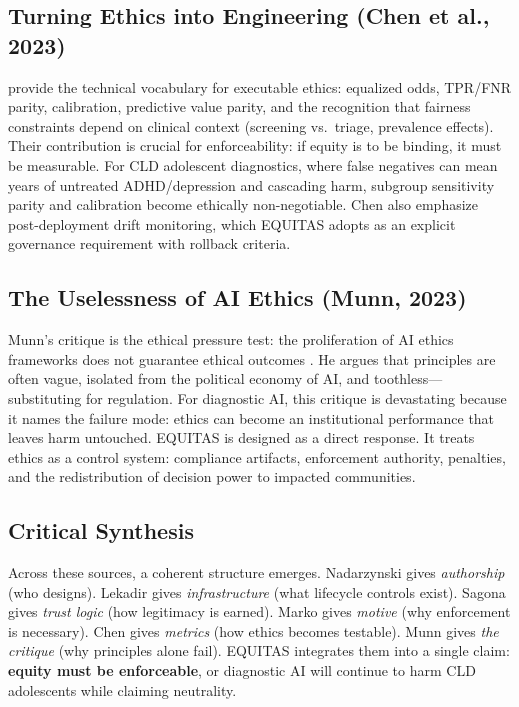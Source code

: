 \subsection{Turning Ethics into Engineering (Chen et al., 2023)}
\citet{Chen2023} provide the technical vocabulary for executable ethics: equalized odds, TPR/FNR parity, calibration, predictive value parity, and the recognition that fairness constraints depend on clinical context (screening vs.\ triage, prevalence effects). Their contribution is crucial for enforceability: if equity is to be binding, it must be measurable. For CLD adolescent diagnostics, where false negatives can mean years of untreated ADHD/depression and cascading harm, subgroup sensitivity parity and calibration become ethically non-negotiable. Chen also emphasize post-deployment drift monitoring, which EQUITAS adopts as an explicit governance requirement with rollback criteria.

\subsection{The Uselessness of AI Ethics (Munn, 2023)}
Munn’s critique is the ethical pressure test: the proliferation of AI ethics frameworks does not guarantee ethical outcomes \citep{Munn2023}. He argues that principles are often vague, isolated from the political economy of AI, and toothless—substituting for regulation. For diagnostic AI, this critique is devastating because it names the failure mode: ethics can become an institutional performance that leaves harm untouched. EQUITAS is designed as a direct response. It treats ethics as a control system: compliance artifacts, enforcement authority, penalties, and the redistribution of decision power to impacted communities.

\subsection{Critical Synthesis}
Across these sources, a coherent structure emerges. Nadarzynski gives \emph{authorship} (who designs). Lekadir gives \emph{infrastructure} (what lifecycle controls exist). Sagona gives \emph{trust logic} (how legitimacy is earned). Marko gives \emph{motive} (why enforcement is necessary). Chen gives \emph{metrics} (how ethics becomes testable). Munn gives \emph{the critique} (why principles alone fail). EQUITAS integrates them into a single claim: \textbf{equity must be enforceable}, or diagnostic AI will continue to harm CLD adolescents while claiming neutrality.


